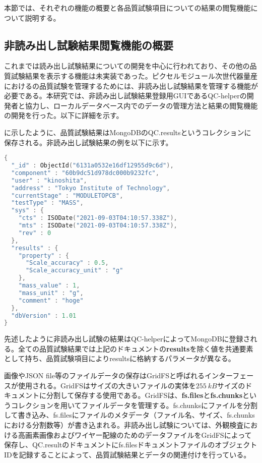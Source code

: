 本節では、それぞれの機能の概要と各品質試験項目についての結果の閲覧機能について説明する。


\subsection{非読み出し試験結果閲覧機能の概要}
\label{sec:non-elec-data}

これまでは読み出し試験結果についての開発を中心に行われており、その他の品質試験結果を表示する機能は未実装であった。ピクセルモジュール次世代器量産におけるの品質試験を管理するためには、非読み出し試験結果を管理する機能が必要である。本研究では、非読み出し試験結果登録用GUIであるQC-helperの開発者と協力し、ローカルデータベース内でのデータの管理方法と結果の閲覧機能の開発を行った。以下に詳細を示す。

に示したように、品質試験結果はMongoDBのQC.resultsというコレクションに保存される。非読み出し試験結果の例を以下に示す。

\begin{lstlisting}[caption=品質試験結果を表すドキュメントの例。以下は質量測定結果の一つを表している。,label=code:nonele, language=C++]
{
  "_id" : ObjectId("6131a0532e16df12955d9c6d"),
  "component" : "60b9dc51d978dc000b9232fc",
  "user" : "kinoshita",
  "address" : "Tokyo Institute of Technology",
  "currentStage" : "MODULETOPCB",
  "testType" : "MASS",
  "sys" : {
    "cts" : ISODate("2021-09-03T04:10:57.338Z"),
    "mts" : ISODate("2021-09-03T04:10:57.338Z"),
    "rev" : 0
  },
  "results" : {
    "property" : {
      "Scale_accuracy" : 0.5,
      "Scale_accuracy_unit" : "g"
    },
    "mass_value" : 1,
    "mass_unit" : "g",
    "comment" : "hoge"
  },
  "dbVersion" : 1.01
}
\end{lstlisting}

先述したように非読み出し試験の結果はQC-helperによってMongoDBに登録される。全ての品質試験結果では上記のドキュメントの\textbf{results}を除く値を共通要素として持ち、品質試験項目によりresultsに格納するパラメータが異なる。

画像やJSON file等のファイルデータの保存はGridFS\cite{mongo}と呼ばれるインターフェースが使用される。GridFSはサイズの大きいファイルの実体を$255\ \si{kB}$サイズのドキュメントに分割して保存する使用である。GridFSは、\textbf{fs.files}と\textbf{fs.chunks}というコレクションを用いてファイルデータを管理する。fs.chunksにファイルを分割して書き込み、fs.filesにファイルのメタデータ（ファイル名、サイズ、fs.chunksにおける分割数等）が書き込まれる。非読み出し試験については、外観検査における高画素画像およびワイヤー配線のためのデータファイルをGridFSによって保存し、QC.resultのドキュメントにfs.filesドキュメントファイルのオブジェクトIDを記録することによって、品質試験結果とデータの関連付けを行っている。


